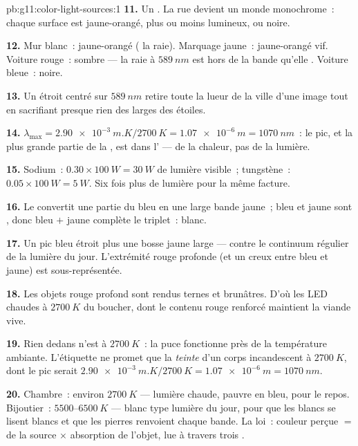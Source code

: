 \begin{solution}{pb:g11:color-light-sources:1}
\textbf{11.} Un . La
rue devient un monde monochrome~: chaque surface est jaune-orangé, plus
ou moins lumineux, ou noire.

\textbf{12.} Mur blanc~: jaune-orangé
( la raie). Marquage jaune~:
jaune-orangé vif. Voiture rouge~: sombre --- la raie à
$\qty{589}{nm}$ est hors de la bande qu'elle
. Voiture bleue~: noire.

\textbf{13.} Un  étroit centré sur
$\qty{589}{nm}$ retire toute la lueur de la ville d'une image tout en
sacrifiant presque rien des  larges des étoiles.

\textbf{14.} $\lambda_{\max} = \qty{2.90e-3}{m.K}/\qty{2700}{K} =
\qty{1.07e-6}{m} = \qty{1070}{nm}$~: le pic, et la plus grande partie
de la , est dans
l' --- de la chaleur, pas de la
lumière.

\textbf{15.} Sodium~: $0.30 \times \qty{100}{W} = \qty{30}{W}$ de
lumière visible~; tungstène~: $0.05 \times \qty{100}{W} = \qty{5}{W}$.
Six fois plus de lumière pour la même facture.

\textbf{16.} Le  convertit une partie
du bleu en une large bande jaune~; bleu et jaune sont ,
donc bleu $+$ jaune complète le triplet~: blanc.

\textbf{17.} Un pic bleu étroit plus une bosse jaune large --- contre
le continuum régulier de la lumière du jour. L'extrémité rouge
profonde (et un creux entre bleu et jaune) est sous-représentée.

\textbf{18.} Les objets rouge profond sont rendus ternes et brunâtres.
D'où les LED chaudes à $\qty{2700}{K}$ du boucher, dont le contenu
rouge renforcé maintient la viande vive.

\textbf{19.} Rien dedans n'est à $\qty{2700}{K}$~: la puce fonctionne
près de la température ambiante. L'étiquette ne promet que la
\emph{teinte} d'un corps incandescent à $\qty{2700}{K}$, dont le pic
serait $\qty{2.90e-3}{m.K}/\qty{2700}{K} = \qty{1.07e-6}{m} =
\qty{1070}{nm}$.

\textbf{20.} Chambre~: environ $\qty{2700}{K}$ --- lumière chaude,
pauvre en bleu, pour le repos. Bijoutier~:
$5500$--$\qty{6500}{K}$ --- blanc type lumière du jour, pour que les
blancs se lisent blancs et que les pierres renvoient chaque bande. La
loi~: couleur perçue $=$  de la source
$\times$ absorption de l'objet, lue à travers trois
.
\end{solution}
